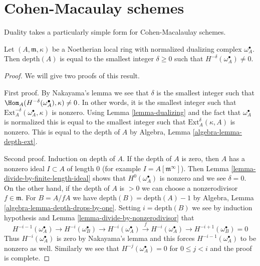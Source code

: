 \section{Cohen-Macaulay schemes}
\label{section-CM}

\noindent
Duality takes a particularly simple form for Cohen-Macalaulay schemes.

\begin{lemma}
\label{lemma-depth-in-terms-dualizing-complex}
Let $(A, \mathfrak m, \kappa)$ be a Noetherian local ring with
normalized dualizing complex $\omega_A^\bullet$.
Then $\text{depth}(A)$ is equal to the smallest integer $\delta \geq 0$
such that $H^{-\delta}(\omega_A^\bullet) \not = 0$.
\end{lemma}

\begin{proof}
We will give two proofs of this result.

\medskip\noindent
First proof. By Nakayama's lemma we see that $\delta$ is the smallest
integer such that $\Hom_A(H^{-\delta}(\omega_A^\bullet), \kappa) \not = 0$.
In other words, it is the smallest integer such that
$\text{Ext}_A^{-\delta}(\omega_A^\bullet, \kappa)$
is nonzero. Using Lemma \ref{lemma-dualizing} and the fact that
$\omega_A^\bullet$ is normalized this is equal to the
smallest integer such that $\text{Ext}_A^\delta(\kappa, A)$ is
nonzero. This is equal to the depth of $A$ by
Algebra, Lemma \ref{algebra-lemma-depth-ext}.

\medskip\noindent
Second proof. Induction on depth of $A$. If the depth of $A$ is zero, then
$A$ has a nonzero ideal $I \subset A$ of length $0$ (for example
$I = A[\mathfrak m^\infty]$). Then
Lemma \ref{lemma-divide-by-finite-length-ideal}
shows that $H^0(\omega_A^\bullet)$ is nonzero and we see $\delta = 0$.
On the other hand, if the depth of $A$ is $> 0$ we can choose a nonzerodivisor
$f \in \mathfrak m$. For $B = A/fA$ we have
$\text{depth}(B) = \text{depth}(A) - 1$ by
Algebra, Lemma \ref{algebra-lemma-depth-drops-by-one}.
Setting $i = \text{depth}(B)$ we see by induction hypothesis and
Lemma \ref{lemma-divide-by-nonzerodivisor} that
$$
H^{-i - 1}(\omega_A^\bullet) \to
H^{-i}(\omega_B^\bullet) \to
H^{-i}(\omega_A^\bullet) \xrightarrow{f} H^{-i}(\omega_A^\bullet)
\to H^{-i + 1}(\omega_B^\bullet) = 0
$$
Thus $H^{-i}(\omega_A^\bullet)$ is zero by Nakayama's lemma
and this forces $H^{-i - 1}(\omega_A^\bullet)$ to be nonzero as well.
Similarly we see that $H^{-j}(\omega_A^\bullet) = 0$
for $0 \leq j < i$ and the proof is complete.
\end{proof}

